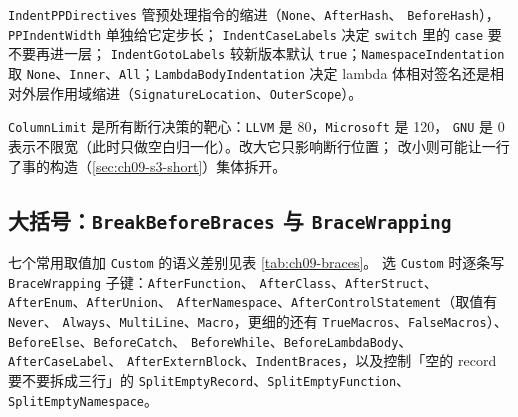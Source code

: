 \documentclass[12pt,a4paper,fontset=fandol]{ctexbook}
\newcommand{\Bk}{\discretionary{}{}{}}
\begin{document}
\texttt{IndentPPDirectives} 管预处理指令的缩进（\texttt{None}、\texttt{AfterHash}、
\texttt{BeforeHash}），\texttt{PPIndent{\Bk}Width} 单独给它定步长；
\texttt{Indent{\Bk}Case{\Bk}Labels} 决定 \texttt{switch} 里的 \texttt{case} 要不要再进一层；
\texttt{Indent{\Bk}Goto{\Bk}Labels} 较新版本默认 \texttt{true}；\texttt{Namespace{\Bk}Indentation} 取
\texttt{None}、\texttt{Inner}、\texttt{All}；\texttt{Lambda{\Bk}Body{\Bk}Indentation} 决定 lambda
体相对签名还是相对外层作用域缩进（\texttt{Signature{\Bk}Location}、\texttt{OuterScope}）。

\texttt{ColumnLimit} 是所有断行决策的靶心：\texttt{LLVM} 是 80，\texttt{Microsoft} 是 120，
\texttt{GNU} 是 0 表示不限宽（此时只做空白归一化）。改大它只影响断行位置；
改小则可能让一行了事的构造（\ref{sec:ch09-s3-short}）集体拆开。

\subsection{大括号：\texttt{BreakBeforeBraces} 与 \texttt{BraceWrapping}}\label{sec:ch09-s3-braces}

七个常用取值加 \texttt{Custom} 的语义差别见表 \ref{tab:ch09-braces}。
选 \texttt{Custom} 时逐条写 \texttt{Brace{\Bk}Wrapping} 子键：\texttt{After{\Bk}Function}、
\texttt{AfterClass}、\texttt{AfterStruct}、\texttt{AfterEnum}、\texttt{AfterUnion}、
\texttt{After{\Bk}Namespace}、\texttt{After{\Bk}Control{\Bk}Statement}（取值有 \texttt{Never}、
\texttt{Always}、\texttt{MultiLine}、\texttt{Macro}，更细的还有
\texttt{TrueMacros}、\texttt{FalseMacros}）、\texttt{BeforeElse}、\texttt{BeforeCatch}、
\texttt{BeforeWhile}、\texttt{Before{\Bk}Lambda{\Bk}Body}、\texttt{After{\Bk}Case{\Bk}Label}、
\texttt{After{\Bk}Extern{\Bk}Block}、\texttt{Indent{\Bk}Braces}，以及控制「空的 record 要不要拆成三行」的
\texttt{Split{\Bk}Empty{\Bk}Record}、\texttt{Split{\Bk}Empty{\Bk}Function}、\texttt{Split{\Bk}Empty{\Bk}Namespace}。
\end{document}
